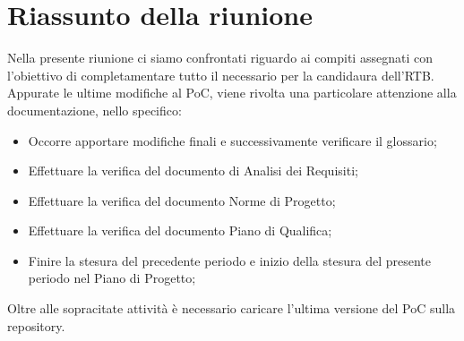 \section{Riassunto della riunione}
Nella presente riunione ci siamo confrontati riguardo ai compiti assegnati con l'obiettivo di completamentare tutto il necessario per la candidaura dell'RTB. Appurate le ultime modifiche al PoC, viene rivolta una particolare attenzione alla documentazione, nello specifico:
\begin{itemize}
    \item Occorre apportare modifiche finali e successivamente verificare il glossario;
    \item Effettuare la verifica del documento di Analisi dei Requisiti;
    \item Effettuare la verifica del documento Norme di Progetto;
    \item Effettuare la verifica del documento Piano di Qualifica;
    \item Finire la stesura del precedente periodo e inizio della stesura del presente periodo nel Piano di Progetto;
\end{itemize}
Oltre alle sopracitate attività è necessario caricare l'ultima versione del PoC sulla repository.